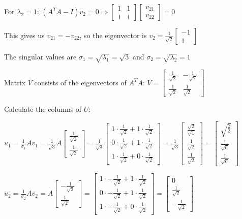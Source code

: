 For $\lambda_2 = 1$:
$(A^TA - I)v_2 = 0 \Rightarrow \begin{bmatrix} 1 & 1 \\ 1 & 1 \end{bmatrix} \begin{bmatrix} v_{21} \\ v_{22} \end{bmatrix} = 0$

This gives us $v_{21} = -v_{22}$, so the eigenvector is $v_2 = \frac{1}{\sqrt{2}}\begin{bmatrix} -1 \\ 1 \end{bmatrix}$

The singular values are $\sigma_1 = \sqrt{\lambda_1} = \sqrt{3}$ and $\sigma_2 = \sqrt{\lambda_2} = 1$

Matrix $V$ consists of the eigenvectors of $A^TA$:
$V = \begin{bmatrix} \frac{1}{\sqrt{2}} & -\frac{1}{\sqrt{2}} \\ \frac{1}{\sqrt{2}} & \frac{1}{\sqrt{2}} \end{bmatrix}$

Calculate the columns of $U$:

$u_1 = \frac{1}{\sigma_1}Av_1 = \frac{1}{\sqrt{3}}A\begin{bmatrix} \frac{1}{\sqrt{2}} \\ \frac{1}{\sqrt{2}} \end{bmatrix} = \frac{1}{\sqrt{3}}\begin{bmatrix} 1 \cdot \frac{1}{\sqrt{2}} + 1 \cdot \frac{1}{\sqrt{2}} \\ 0 \cdot \frac{1}{\sqrt{2}} + 1 \cdot \frac{1}{\sqrt{2}} \\ 1 \cdot \frac{1}{\sqrt{2}} + 0 \cdot \frac{1}{\sqrt{2}} \end{bmatrix} = \frac{1}{\sqrt{3}}\begin{bmatrix} \frac{\sqrt{2}}{\sqrt{1}} \\ \frac{1}{\sqrt{2}} \\ \frac{1}{\sqrt{2}} \end{bmatrix} = \begin{bmatrix} \sqrt{\frac{2}{3}} \\ \frac{1}{\sqrt{6}} \\ \frac{1}{\sqrt{6}} \end{bmatrix}$

$u_2 = \frac{1}{\sigma_2}Av_2 = A\begin{bmatrix} -\frac{1}{\sqrt{2}} \\ \frac{1}{\sqrt{2}} \end{bmatrix} = \begin{bmatrix} 1 \cdot -\frac{1}{\sqrt{2}} + 1 \cdot \frac{1}{\sqrt{2}} \\ 0 \cdot -\frac{1}{\sqrt{2}} + 1 \cdot \frac{1}{\sqrt{2}} \\ 1 \cdot -\frac{1}{\sqrt{2}} + 0 \cdot \frac{1}{\sqrt{2}} \end{bmatrix} = \begin{bmatrix} 0 \\ \frac{1}{\sqrt{2}} \\ -\frac{1}{\sqrt{2}} \end{bmatrix}$

